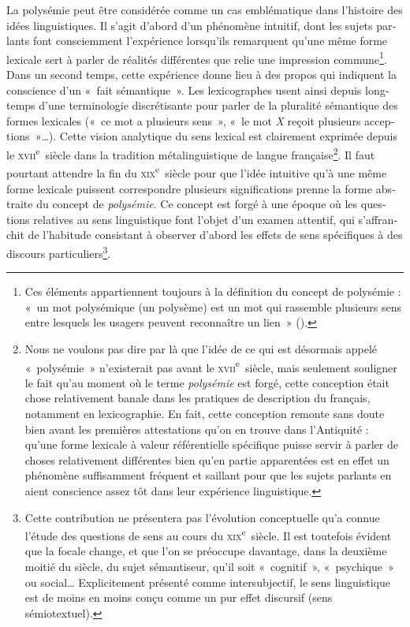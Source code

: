 \documentclass[output=paper]{langsci/langscibook}
\begin{document}
\begin{otherlanguage}{french}
La polysémie peut être considérée comme un cas emblématique dans l’histoire des idées linguistiques. Il s’agit d’abord d’un phénomène intuitif, dont les sujets parlants font consciemment l’expérience lorsqu’ils remarquent qu’une même forme lexicale sert à parler de réalités différentes que relie une impression commune\footnote{ \textrm{Ces éléments appartiennent toujours à la définition du concept de polysémie : «~un mot polysémique (un polysème) est un mot qui rassemble plusieurs sens entre lesquels les usagers peuvent reconnaître un lien~» (\citealt[94]{nyckees_semantique_1998}).}}. Dans un second temps, cette expérience donne lieu à des propos qui indiquent la conscience d’un «~fait sémantique~». Les lexicographes usent ainsi depuis longtemps d’une terminologie discrétisante pour parler de la pluralité sémantique des formes lexicales («~ce mot a plusieurs sens~», «~le mot \textit{X} reçoit plusieurs acceptions~»…). Cette vision analytique du sens lexical est clairement exprimée depuis le \textsc{xvii}\textsuperscript{e}~siècle dans la tradition métalinguistique de langue française\footnote{ \textrm{Nous ne voulons pas dire par là que l’idée de ce qui est désormais appelé «~polysémie~» n’existerait pas avant le} \textrm{\textsc{xvii}}\textrm{\textsuperscript{e}}\textrm{~siècle, mais seulement souligner le fait qu’au moment où le terme} \textrm{\textit{polysémie}} \textrm{est forgé, cette conception était chose relativement banale dans les pratiques de description du français, notamment en lexicographie. En fait, cette conception remonte sans doute bien avant les premières attestations qu’on en trouve dans l’Antiquité : qu’une forme lexicale à valeur référentielle spécifique puisse servir à parler de choses relativement différentes bien qu’en partie apparentées est en effet un phénomène suffisamment fréquent et saillant pour que les sujets parlants en aient conscience assez tôt dans leur expérience linguistique.}}. Il faut pourtant attendre la fin du \textsc{xix}\textsuperscript{e}~siècle pour que l’idée intuitive qu’à une même forme lexicale puissent correspondre plusieurs significations prenne la forme abstraite du concept de \textit{polysémie}. Ce concept est forgé à une époque où les questions relatives au sens linguistique font l’objet d’un examen attentif, qui s’affranchit de l’habitude consistant à observer d’abord les effets de sens spécifiques à des discours particuliers\footnote{ \textrm{Cette contribution ne présentera pas l’évolution conceptuelle qu’a connue l’étude des questions de sens au cours du} \textrm{\textsc{xix}}\textrm{\textsuperscript{e}}\textrm{~siècle. Il est toutefois évident que la focale change, et que l’on se préoccupe davantage, dans la deuxième moitié du siècle, du sujet sémantiseur, qu’il soit «~cognitif~», «~psychique~» ou social… Explicitement présenté comme intersubjectif, le sens linguistique est de moins en moins conçu comme un pur effet discursif (sens sémiotextuel).}}.


\end{otherlanguage}
\end{document}
